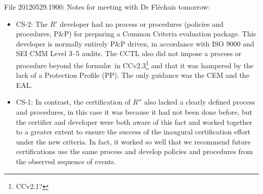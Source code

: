 \documentclass[a4paper]{article}
\begin{document}



File 20120529.1900: Notes for meeting with Dr Fl\'echais tomorrow:
\begin{itemize}
	\item CS-2: The $R'$ developer had no process or procedures (policies and procedures, P\&P) for
		preparing a Common Criteria evaluation package.  This developer is normally entirely P\&P
		driven, in accordance with ISO 9000 and SEI CMM Level 3--5 audits.  The CCTL also did not
		impose a process or procedure beyond the formul\ae\ in CCv2.3\footnote{CCv2.1?} and that it
		was hampered by the lack of a Protection Profile (PP).  The only guidance was the CEM and
		the EAL.
	\item CS-1: In contrast, the certification of $R''$ also lacked a clearly defined process and
		procedures, in this case it was because it had not been done before, but the certifier and
		developer were both aware of this fact and worked together to a greater extent to ensure
		the success of the inaugural certification effort under the new criteria.  In fact, it
		worked so well that we recommend future certifications use the same process and develop
		policies and procedures from the observed sequence of events.
\end{itemize}


\end{document}
